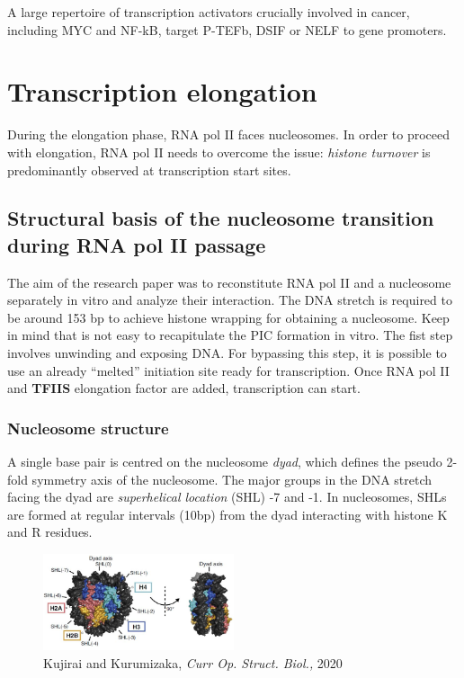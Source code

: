 A large repertoire of transcription activators crucially involved in cancer, including MYC and NF-kB, target P-TEFb, DSIF or NELF to gene promoters.

\section{Transcription elongation}

During the elongation phase, RNA pol II faces nucleosomes. In order to proceed with elongation, RNA pol II needs to overcome the issue: \emph{histone turnover} is predominantly observed at transcription start sites.

\hypertarget{structural-basis-of-the-nucleosome-transition-during-rna-pol-ii-passage---kujirai-et-al-2018}{%
\subsection{Structural basis of the nucleosome transition during RNA pol II passage}\label{structural-basis-of-the-nucleosome-transition-during-rna-pol-ii-passage---kujirai-et-al-2018}}

The aim of the research paper was to reconstitute RNA pol II and a nucleosome separately in vitro and analyze their interaction. The DNA stretch is required to be around 153 bp to achieve histone wrapping for obtaining a nucleosome. Keep in mind that is not easy to recapitulate the PIC formation in vitro. The fist step involves unwinding and exposing DNA. For bypassing this step, it is possible to use an already ``melted'' initiation site ready for transcription. Once RNA pol II and \textbf{TFIIS} elongation factor are added, transcription can start.

\hypertarget{nucleosome-structure}{%
\subsubsection{Nucleosome structure}\label{nucleosome-structure}}

A single base pair is centred on the nucleosome \emph{dyad}, which defines the pseudo 2-fold symmetry axis of the nucleosome. The major groups in the DNA stretch facing the dyad are \emph{superhelical location} (SHL) -7 and -1. In nucleosomes, SHLs are formed at regular intervals (10bp) from the dyad interacting with histone K and R residues.

\begin{figure}
\centering
\includegraphics[width=0.5\textwidth]{../_resources/Screenshot_2022-10-05_at_22-41-07.png}
\caption{Kujirai and Kurumizaka, \emph{Curr Op. Struct. Biol.,} 2020}
\end{figure}



